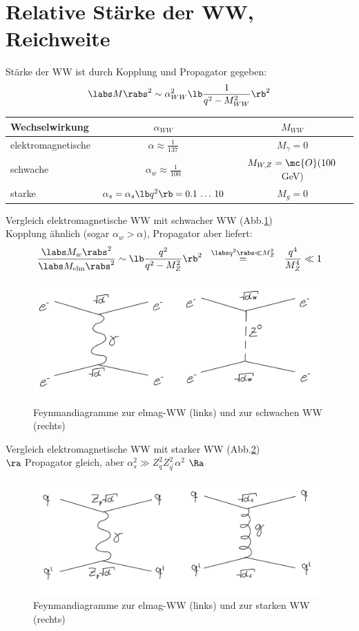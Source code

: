 \section{Relative Stärke der WW, Reichweite}
Stärke der WW ist durch Kopplung und Propagator gegeben:
\begin{align}
\labs M \rabs ^2 \sim \alpha_{WW}^2 \lb  \frac{1}{q^2 - M^2_{WW}} \rb ^2
\end{align}
\begin{table}[h]
\centering
\begin{tabular}{l |c |c}
Wechselwirkung & $\alpha_{WW}$ & $M_{WW}$\\
\hline
elektromagnetische & $\alpha \approx \frac{1}{137}$ & $M_\gamma = 0$ \\
schwache & $\alpha_w \approx \frac{1}{100}$ & $M_{W,Z} = \mc{O}(100$\,GeV)\\
starke & $\alpha_s = \alpha_s\lb q^2\rb  = 0.1 \, \dots \, 10$ & $M_g = 0$
\end{tabular}
\end{table}
 Vergleich elektromagnetische WW mit schwacher WW (Abb.\ref{fig:2.7})\\
Kopplung ähnlich (sogar $\alpha_w > \alpha$), Propagator aber liefert:
\begin{align}
\frac{\labs M_w \rabs ^2}{\labs M_\mathrm{elm}\rabs^2} \sim \lb  \frac{q^2}{q^2 - M_Z^2}\rb ^2\ \  \overset{\labs q^2 \rabs \ll M_Z^2}{=}\ \  \frac{q^4}{M_Z^4} \ll 1
\end{align}
\begin{figure}[!ht]
\centering
\includegraphics[width=.5\textwidth]{imgs/ep5-fig-2-7.pdf}
\caption{Feynmandiagramme zur elmag-WW (links) und zur schwachen WW (rechts)\label{fig:2.7}}
\end{figure}

\noindent{} Vergleich elektromagnetische WW mit starker WW (Abb.\ref{fig:2.8})\\
$\ra$ Propagator gleich, aber $\alpha_s^2 \gg Z_q^2 Z_{q^\prime}^2 \alpha^2$ $\Ra$ 
\begin{figure}[!ht]
\centering
\includegraphics[width=.5\textwidth]{imgs/ep5-fig-2-8.pdf}
\caption{Feynmandiagramme zur elmag-WW (links) und zur starken WW (rechts)\label{fig:2.8}}
\end{figure}

